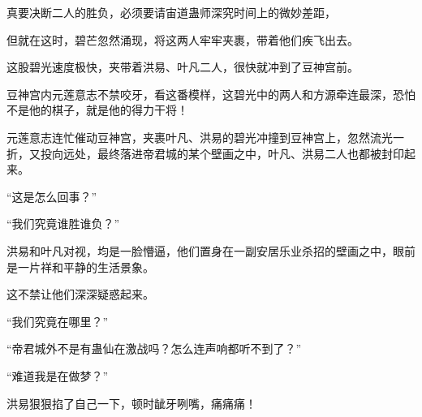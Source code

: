 \begin{this_body}
真要决断二人的胜负，必须要请宙道蛊师深究时间上的微妙差距，

但就在这时，碧芒忽然涌现，将这两人牢牢夹裹，带着他们疾飞出去。

这股碧光速度极快，夹带着洪易、叶凡二人，很快就冲到了豆神宫前。

豆神宫内元莲意志不禁咬牙，看这番模样，这碧光中的两人和方源牵连最深，恐怕不是他的棋子，就是他的得力干将！

元莲意志连忙催动豆神宫，夹裹叶凡、洪易的碧光冲撞到豆神宫上，忽然流光一折，又投向远处，最终落进帝君城的某个壁画之中，叶凡、洪易二人也都被封印起来。

“这是怎么回事？”

“我们究竟谁胜谁负？”

洪易和叶凡对视，均是一脸懵逼，他们置身在一副安居乐业杀招的壁画之中，眼前是一片祥和平静的生活景象。

这不禁让他们深深疑惑起来。

“我们究竟在哪里？”

“帝君城外不是有蛊仙在激战吗？怎么连声响都听不到了？”

“难道我是在做梦？”

洪易狠狠掐了自己一下，顿时龇牙咧嘴，痛痛痛！

\end{this_body}

